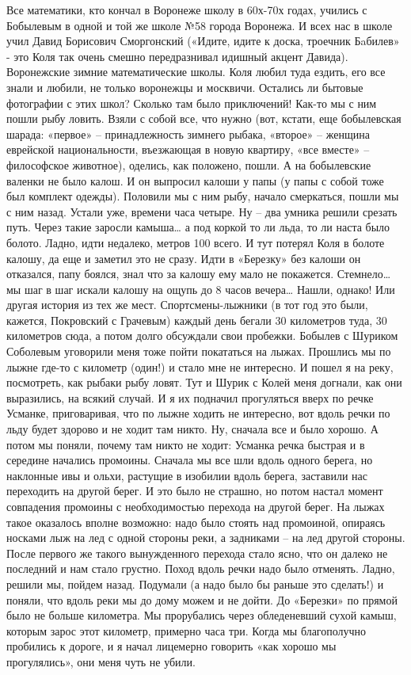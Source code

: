 Все математики, кто кончал в Воронеже школу в 60х-70х годах, учились с Бобылевым в одной и той же школе №58 города Воронежа. И всех нас в школе учил Давид Борисович Сморгонский («Идите, идите к доска, троечник Бaбилев» - это Коля так очень смешно передразнивал идишный акцент Давида). Воронежские зимние математические школы. Коля любил туда ездить, его все знали и любили, не только воронежцы и москвичи. Остались ли бытовые фотографии с этих школ? Сколько там было приключений! Как-то мы с ним пошли рыбу ловить. Взяли с собой все, что нужно (вот, кстати, еще бобылевская шарада: «первое» – принадлежность зимнего рыбака, «второе» – женщина еврейской национальности, въезжающая в новую квартиру, «все вместе» – философское животное), оделись, как положено, пошли. А на бобылевские валенки не было калош. И он выпросил калоши у папы (у папы с собой тоже был комплект одежды). Половили мы с ним рыбу, начало смеркаться, пошли мы с ним назад. Устали уже, времени часа четыре. Ну – два умника решили срезать путь. Через такие заросли камыша… а под коркой то ли льда, то ли наста было болото. Ладно, идти недалеко, метров 100 всего. И тут потерял Коля в болоте калошу, да еще и заметил это не сразу. Идти в «Березку» без калоши он отказался, папу боялся, знал что за калошу ему мало не покажется. Стемнело… мы шаг в шаг искали калошу на ощупь до 8 часов вечера… Нашли, однако! Или другая история из тех же мест. Спортсмены-лыжники (в тот год это были, кажется, Покровский с Грачевым) каждый день бегали 30 километров туда, 30 километров сюда, а потом долго обсуждали свои пробежки. Бобылев с Шуриком Соболевым уговорили меня тоже пойти покататься на лыжах. Прошлись мы по лыжне где-то с километр (один!) и стало мне не интересно. И пошел я на реку, посмотреть, как рыбаки рыбу ловят. Тут и Шурик с Колей меня догнали, как они выразились, на всякий случай. И я их подначил прогуляться вверх по речке Усманке, приговаривая, что по лыжне ходить не интересно, вот вдоль речки по льду будет здорово и не ходит там никто. Ну, сначала все и было хорошо. А потом мы поняли, почему там никто не ходит: Усманка речка быстрая и в середине начались промоины. Сначала мы все шли вдоль одного берега, но наклонные ивы и ольхи, растущие в изобилии вдоль берега, заставили нас переходить на другой берег. И это было не страшно, но потом настал момент совпадения промоины с необходимостью перехода на другой берег. На лыжах такое оказалось вполне возможно: надо было стоять над промоиной, опираясь носками лыж на лед с одной стороны реки, а задниками – на лед другой стороны. После первого же такого вынужденного перехода стало ясно, что он далеко не последний и нам стало грустно. Поход вдоль речки надо было отменять. Ладно, решили мы, пойдем назад. Подумали (а надо было бы раньше это сделать!) и поняли, что вдоль реки мы до дому можем и не дойти. До «Березки» по прямой было не больше километра. Мы прорубались через обледеневший сухой камыш, которым зарос этот километр, примерно часа три. Когда мы благополучно пробились к дороге, и я начал лицемерно говорить «как хорошо мы прогулялись», они меня чуть не убили.

